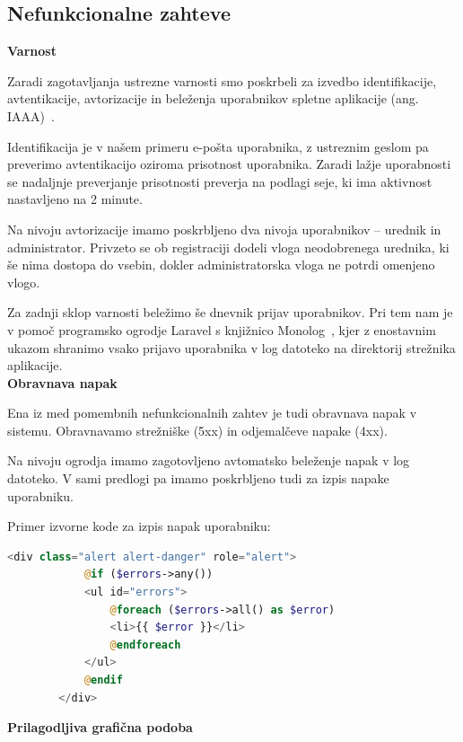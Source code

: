 \documentclass[a4paper, 12pt]{book}
\begin{document}
\subsection{Nefunkcionalne zahteve}

\noindent \textbf{Varnost}

Zaradi zagotavljanja ustrezne varnosti smo poskrbeli za izvedbo identifikacije, avtentikacije, avtorizacije in beleženja uporabnikov spletne aplikacije (ang. IAAA)~\cite{IAAA-security}.

Identifikacija je v našem primeru e-pošta uporabnika, z ustreznim geslom pa preverimo avtentikacijo oziroma prisotnost uporabnika. Zaradi lažje uporabnosti se nadaljnje preverjanje prisotnosti preverja na podlagi seje, ki ima aktivnost nastavljeno na 2 minute. 

Na nivoju avtorizacije imamo poskrbljeno dva nivoja uporabnikov – urednik in administrator. Privzeto se ob registraciji dodeli vloga neodobrenega urednika, ki še nima dostopa do vsebin, dokler administratorska vloga ne potrdi omenjeno vlogo.

Za zadnji sklop varnosti beležimo še dnevnik prijav uporabnikov. Pri tem nam je v pomoč programsko ogrodje Laravel s knjižnico Monolog~\cite{laravel-monolog}, kjer z enostavnim ukazom shranimo vsako prijavo uporabnika v log datoteko na direktorij strežnika aplikacije. \\

\noindent \textbf{Obravnava napak}

Ena iz med pomembnih nefunkcionalnih zahtev je tudi obravnava napak v sistemu. Obravnavamo strežniške (5xx) in odjemalčeve napake (4xx). 


Na nivoju ogrodja imamo zagotovljeno avtomatsko beleženje napak v log datoteko. V sami predlogi pa imamo poskrbljeno tudi za izpis napake uporabniku.

Primer izvorne kode za izpis napak uporabniku:

\begin{lstlisting}[language=PHP, style=mystyle]
        <div class="alert alert-danger" role="alert">
            @if ($errors->any())
            <ul id="errors">
                @foreach ($errors->all() as $error)
                <li>{{ $error }}</li>
                @endforeach
            </ul>
            @endif
        </div>
\end{lstlisting}

\vspace{5mm}

\noindent \textbf{Prilagodljiva grafična podoba}
\end{document}
